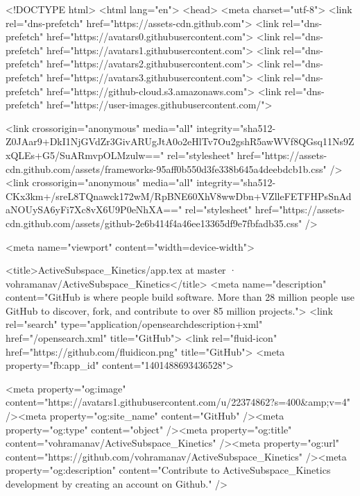 





<!DOCTYPE html>
<html lang="en">
  <head>
    <meta charset="utf-8">
  <link rel="dns-prefetch" href="https://assets-cdn.github.com">
  <link rel="dns-prefetch" href="https://avatars0.githubusercontent.com">
  <link rel="dns-prefetch" href="https://avatars1.githubusercontent.com">
  <link rel="dns-prefetch" href="https://avatars2.githubusercontent.com">
  <link rel="dns-prefetch" href="https://avatars3.githubusercontent.com">
  <link rel="dns-prefetch" href="https://github-cloud.s3.amazonaws.com">
  <link rel="dns-prefetch" href="https://user-images.githubusercontent.com/">



  <link crossorigin="anonymous" media="all" integrity="sha512-Z0JAar9+DkI1NjGVdZr3GivARUgJtA0o2eHlTv7Ou2gshR5awWVf8QGsq11Ns9ZxQLEs+G5/SuARmvpOLMzulw==" rel="stylesheet" href="https://assets-cdn.github.com/assets/frameworks-95aff0b550d3fe338b645a4deebdcb1b.css" />
  <link crossorigin="anonymous" media="all" integrity="sha512-CKx3km+/sreL8TQnawck172wM/RpBNE60XhV8wwDbn+VZlleFETFHPsSnAdaNOUySA6yFi7Xc8vX6U9P0eNhXA==" rel="stylesheet" href="https://assets-cdn.github.com/assets/github-2e6b414f4a46ee13365df9e7fbfadb35.css" />
  
  
  
  

  <meta name="viewport" content="width=device-width">
  
  <title>ActiveSubspace_Kinetics/app.tex at master · vohramanav/ActiveSubspace_Kinetics</title>
    <meta name="description" content="GitHub is where people build software. More than 28 million people use GitHub to discover, fork, and contribute to over 85 million projects.">
    <link rel="search" type="application/opensearchdescription+xml" href="/opensearch.xml" title="GitHub">
  <link rel="fluid-icon" href="https://github.com/fluidicon.png" title="GitHub">
  <meta property="fb:app_id" content="1401488693436528">

    
    <meta property="og:image" content="https://avatars1.githubusercontent.com/u/22374862?s=400&amp;v=4" /><meta property="og:site_name" content="GitHub" /><meta property="og:type" content="object" /><meta property="og:title" content="vohramanav/ActiveSubspace_Kinetics" /><meta property="og:url" content="https://github.com/vohramanav/ActiveSubspace_Kinetics" /><meta property="og:description" content="Contribute to ActiveSubspace_Kinetics development by creating an account on Github." />

